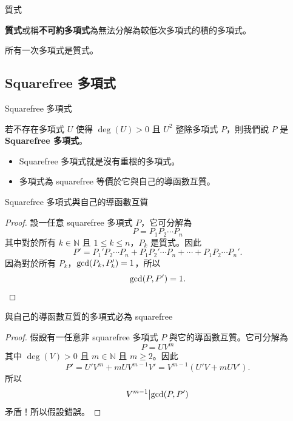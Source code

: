 \documentclass{beamer}
\newcommand{\Left} {\mathopen{}\mathclose\bgroup\left}
\newcommand{\Right}{\aftergroup\egroup\right}
\newcommand{\N}{\mathbb N}
\theoremstyle{remark}
\begin{document}
\begin{CJK}{UTF8}{bsmi}
\begin{frame}{質式}
  \begin{definition}
    \textbf{質式}或稱\textbf{不可約多項式}為無法分解為較低次多項式的積的多項式。
  \end{definition}
  \begin{theorem}
    所有一次多項式是質式。
  \end{theorem}
\end{frame}

\subsection[Squarefree]{Squarefree 多項式}
\begin{frame}{Squarefree 多項式}
  \begin{definition}
    若不存在多項式 $U$ 使得 $\deg(U) > 0$ 且 $U^2$ 整除多項式 $P$，則我們說 $P$ 是 \textbf{Squarefree 多項式}。
  \end{definition}
  \begin{theorem}
    \begin{itemize}
      \item Squarefree 多項式就是沒有重根的多項式。
      \item 多項式為 squarefree 等價於它與自己的導函數互質。
    \end{itemize}
  \end{theorem}
\end{frame}

\begin{frame}{Squarefree 多項式與自己的導函數互質}
  \begin{proof}
    設一任意 squarefree 多項式 $P$，它可分解為
    \[P = P_1 P_2 \cdots P_n\]
    其中對於所有 $k \in \N$ 且 $1 \le k \le n$，$P_k$ 是質式。因此
    \[P' = P_1' P_2 \cdots P_n + P_1 P_2' \cdots P_n + \cdots + P_1 P_2 \cdots P_n'.\]
    因為對於所有 $P_k$，$\gcd \Left( P_k, P_k' \Right) = 1$，所以
    \[\gcd \Left( P, P'\Right) = 1. \qedhere\]
  \end{proof}
\end{frame}

\begin{frame}{與自己的導函數互質的多項式必為 squarefree}
  \begin{proof}
    假設有一任意非 squarefree 多項式 $P$ 與它的導函數互質。它可分解為
    \[P = UV^m\]
    其中 $\deg(V) > 0$ 且 $m \in \N$ 且 $m \ge 2$。因此
    \[P' = U'V^m + mUV^{m-1}V' = V^{m-1} \left( U'V + mUV' \right).\]
    所以
    \[\left. V^{m-1} \middle| \gcd \Left( P, P' \Right) \right.\]
    矛盾！所以假設錯誤。
  \end{proof}
\end{frame}


\end{CJK}
\end{document}
